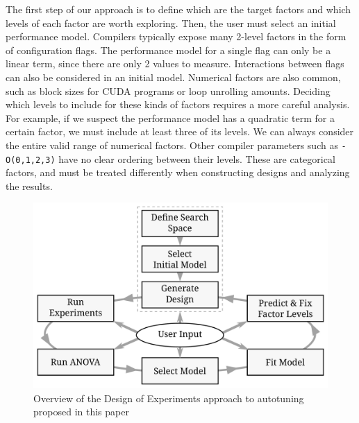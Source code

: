\documentclass[conference]{IEEEtran}
\begin{document}
The first step of our approach is to define which are the target factors and
which levels of each factor are worth exploring. Then, the user must select an
initial performance model. Compilers typically expose many 2-level factors in
the form of configuration flags. The performance model for a single flag can
only be a linear term, since there are only 2 values to measure. Interactions
between flags can also be considered in an initial model. Numerical factors are
also common, such as block sizes for CUDA programs or loop unrolling amounts.
Deciding which levels to include for these kinds of factors requires a more
careful analysis. For example, if we suspect the performance model has a
quadratic term for a certain factor, we must include at least three of its
levels. We can always consider the entire valid range of numerical factors.
Other compiler parameters such as \texttt{-O(0,1,2,3)} have no clear ordering
between their levels. These are categorical factors, and must be treated
differently when constructing designs and analyzing the results.

\begin{center}
\begin{figure}[htbp]
\centering
\includegraphics[width=.95\columnwidth]{./img/doe_anova_strategy.pdf}
\caption{\label{fig:org47b2ccc}
Overview of the Design of Experiments approach to autotuning proposed in this paper}
\end{figure}
\end{center}
\end{document}
